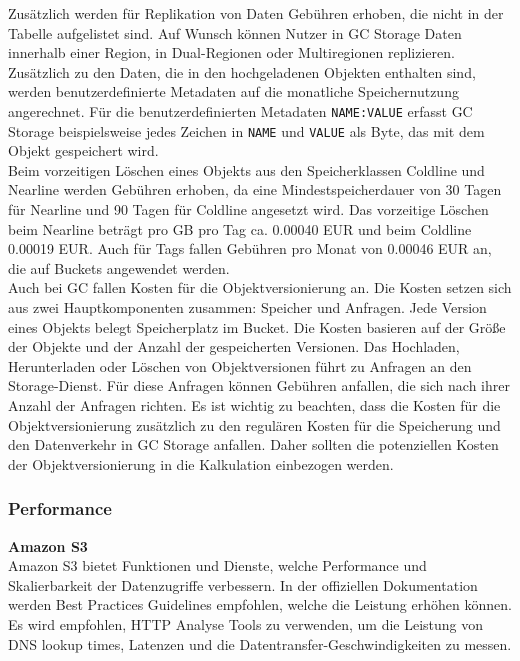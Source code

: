 Zusätzlich werden für Replikation von Daten Gebühren erhoben, die nicht in der Tabelle aufgelistet sind. Auf Wunsch können Nutzer in GC Storage Daten innerhalb einer Region, in Dual-Regionen oder Multiregionen replizieren. Zusätzlich zu den Daten, die in den hochgeladenen Objekten enthalten sind, werden benutzerdefinierte Metadaten auf die monatliche Speichernutzung angerechnet. Für die benutzerdefinierten Metadaten \verb|NAME:VALUE| erfasst GC Storage beispielsweise jedes Zeichen in \verb|NAME| und \verb|VALUE| als Byte, das mit dem Objekt gespeichert wird.\\

Beim vorzeitigen Löschen eines Objekts aus den Speicherklassen Coldline und Nearline werden Gebühren erhoben, da eine Mindestspeicherdauer von 30 Tagen für Nearline und 90 Tagen für Coldline angesetzt wird. Das vorzeitige Löschen beim Nearline beträgt pro GB pro Tag ca. 0.00040 EUR und beim Coldline 0.00019 EUR. Auch für Tags fallen Gebühren pro Monat von 0.00046 EUR an, die auf Buckets angewendet werden.\\

Auch bei GC fallen Kosten für die Objektversionierung an. Die Kosten setzen sich aus zwei Hauptkomponenten zusammen: Speicher und Anfragen. Jede Version eines Objekts belegt Speicherplatz im Bucket. Die Kosten basieren auf der Größe der Objekte und der Anzahl der gespeicherten Versionen. Das Hochladen, Herunterladen oder Löschen von Objektversionen führt zu Anfragen an den Storage-Dienst. Für diese Anfragen können Gebühren anfallen, die sich nach ihrer Anzahl der Anfragen richten. Es ist wichtig zu beachten, dass die Kosten für die Objektversionierung zusätzlich zu den regulären Kosten für die Speicherung und den Datenverkehr in GC Storage anfallen. Daher sollten die potenziellen Kosten der Objektversionierung in die Kalkulation einbezogen werden.

\newpage

\subsubsection{Performance}

\textbf{Amazon S3}\\

Amazon S3 bietet Funktionen und Dienste, welche Performance und Skalierbarkeit der Datenzugriffe verbessern. In der offiziellen Dokumentation \cite{performance-guide} werden Best Practices Guidelines empfohlen, welche die Leistung erhöhen können. Es wird empfohlen, HTTP Analyse Tools zu verwenden, um die Leistung von DNS lookup times, Latenzen und die Datentransfer-Geschwindigkeiten zu messen.\\

